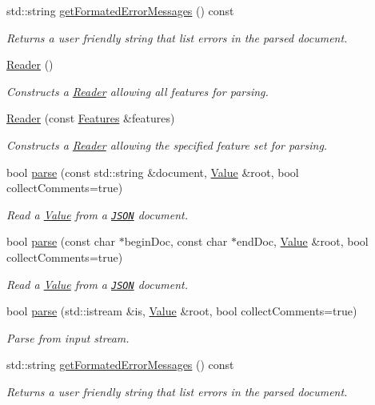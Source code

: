 \begin{DoxyCompactItemize}
std\-::string \hyperlink{classJson_1_1Reader_afa4a59e962d23c4d1c38b433fc95eefa}{get\-Formated\-Error\-Messages} () const 
\begin{DoxyCompactList}\small\item\em Returns a user friendly string that list errors in the parsed document. \end{DoxyCompactList}\item 
\hyperlink{classJson_1_1Reader_a0b3c4e24c8393354bab57a6ba3ffc27f}{Reader} ()
\begin{DoxyCompactList}\small\item\em Constructs a \hyperlink{classJson_1_1Reader}{Reader} allowing all features for parsing. \end{DoxyCompactList}\item 
\hyperlink{classJson_1_1Reader_a45f17831118337309180313e93ac33f8}{Reader} (const \hyperlink{classJson_1_1Features}{Features} \&features)
\begin{DoxyCompactList}\small\item\em Constructs a \hyperlink{classJson_1_1Reader}{Reader} allowing the specified feature set for parsing. \end{DoxyCompactList}\item 
bool \hyperlink{classJson_1_1Reader_af1da6c976ad1e96c742804c3853eef94}{parse} (const std\-::string \&document, \hyperlink{classJson_1_1Value}{Value} \&root, bool collect\-Comments=true)
\begin{DoxyCompactList}\small\item\em Read a \hyperlink{classJson_1_1Value}{Value} from a \href{http://www.json.org}{\tt J\-S\-O\-N} document. \end{DoxyCompactList}\item 
bool \hyperlink{classJson_1_1Reader_ac71ef2b64c7c27b062052e692af3fb32}{parse} (const char $\ast$begin\-Doc, const char $\ast$end\-Doc, \hyperlink{classJson_1_1Value}{Value} \&root, bool collect\-Comments=true)
\begin{DoxyCompactList}\small\item\em Read a \hyperlink{classJson_1_1Value}{Value} from a \href{http://www.json.org}{\tt J\-S\-O\-N} document. \end{DoxyCompactList}\item 
bool \hyperlink{classJson_1_1Reader_a8d0347e6b47343e4bc68be7ecdb9c4e9}{parse} (std\-::istream \&is, \hyperlink{classJson_1_1Value}{Value} \&root, bool collect\-Comments=true)
\begin{DoxyCompactList}\small\item\em Parse from input stream. \end{DoxyCompactList}\item 
std\-::string \hyperlink{classJson_1_1Reader_afa4a59e962d23c4d1c38b433fc95eefa}{get\-Formated\-Error\-Messages} () const 
\begin{DoxyCompactList}\small\item\em Returns a user friendly string that list errors in the parsed document. \end{DoxyCompactList}\end{DoxyCompactItemize}
